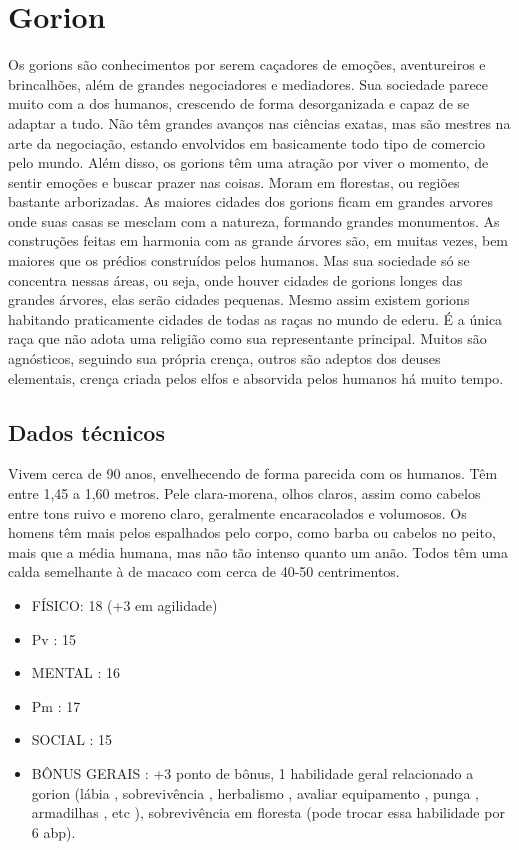 \section{Gorion}

Os gorions são conhecimentos por serem caçadores de emoções, aventureiros e brincalhões, além de grandes negociadores e mediadores. Sua sociedade parece muito com a dos humanos, crescendo de forma desorganizada e capaz de se adaptar a tudo. Não têm grandes avanços nas ciências exatas, mas são mestres na arte da negociação, estando envolvidos em basicamente todo tipo de comercio pelo mundo. Além disso, os gorions têm uma atração por viver o momento, de sentir emoções e buscar prazer nas coisas. Moram em florestas, ou regiões bastante arborizadas. As maiores cidades dos gorions ficam em grandes arvores onde suas casas se mesclam com a natureza, formando grandes monumentos. As construções feitas em harmonia com as grande árvores são, em muitas vezes, bem maiores que os prédios construídos pelos humanos. Mas sua sociedade só se concentra nessas áreas, ou seja, onde houver cidades de gorions longes das grandes árvores, elas serão cidades pequenas. Mesmo assim existem gorions habitando praticamente cidades de todas as raças no mundo de ederu. É a única raça que não adota uma religião como sua representante principal. Muitos são agnósticos, seguindo sua própria crença, outros são adeptos dos deuses elementais, crença criada pelos elfos e absorvida pelos humanos há muito tempo.


\subsection{Dados técnicos}

Vivem cerca de 90 anos, envelhecendo de forma parecida com os humanos. Têm entre 1,45 a 1,60 metros. Pele clara-morena, olhos claros, assim como cabelos entre tons ruivo e moreno claro, geralmente encaracolados e volumosos. Os homens têm mais pelos espalhados pelo corpo, como barba ou cabelos no peito, mais que a média humana, mas não tão intenso quanto um anão. Todos têm uma calda semelhante à de macaco com cerca de 40-50 centrimentos.

\begin{itemize}
	\item FÍSICO: 18 (+3 em agilidade)
	\item Pv : 15 

	\item MENTAL : 16
	\item Pm : 17 

	\item SOCIAL : 15

	\item BÔNUS GERAIS : +3 ponto de bônus, 1 habilidade geral relacionado a gorion (lábia , sobrevivência , herbalismo , avaliar equipamento , punga , armadilhas , etc ), sobrevivência em floresta (pode trocar essa habilidade por 6 abp).
\end{itemize}

